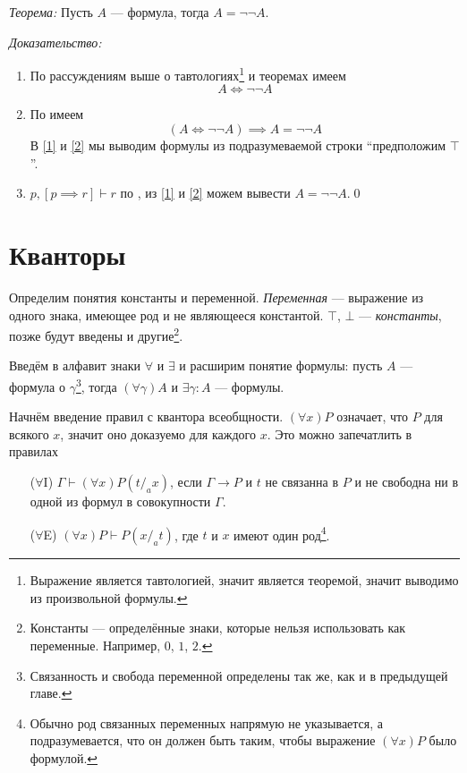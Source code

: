 {\it Теорема:} Пусть $A$ --- формула, тогда $A=\lnot\lnot A$.

	{\it Доказательство:}
\begin{enumerate}[label=(\arabic*)]
	\item{}\label{1}По рассуждениям выше о тавтологиях\footnote{
		Выражение является тавтологией, значит является теоремой,
		значит выводимо из произвольной формулы.} и теоремах
	имеем
	\[
		A\iff\lnot\lnot A
	\]

	\item{}\label{2}По \axiom{} имеем
	\[
		(A\iff \lnot\lnot A)\implies A=\lnot\lnot A
	\]
	В \ref{1} и \ref{2} мы выводим формулы из
	подразумеваемой строки ``предположим $\top$''.

	\item{}\label{3}${p,[p\implies r]\vdash r}$ по \taut{},
	из \ref{1} и \ref{2}
	можем вывести $A=\lnot\lnot A$.\qed
\end{enumerate}

\section{Кванторы}

\newcommand\Aii{$\forall$I}
\newcommand\Aee{$\forall$E}
\newcommand\Eii{$\exists$I}
\newcommand\Eee{$\exists$E}

Определим понятия константы и переменной. {\it Переменная} --- выражение из одного
знака, имеющее род и не являющееся константой. $\top$, $\bot$ --- {\it константы},
позже будут введены и другие\footnote{
	Константы --- определённые знаки, которые нельзя использовать как переменные.
	Например, $0$, $1$, $2$.
}.

Введём в алфавит знаки $\forall$ и $\exists$ и расширим понятие формулы:
пусть $A$ --- формула о $\gamma$\footnote{
	Связанность и свобода переменной определены так же, как и в предыдущей главе.
},
тогда $(\forall\gamma)A$ и $\exists\gamma:A$ --- формулы.

Начнём введение правил с квантора всеобщности. $(\forall x)P$ означает, что $P$ для
всякого $x$, значит оно доказуемо для каждого $x$. Это можно запечатлить
в правилах
\begin{enumerate}
	\item[(\Aii{})]{}$\Gamma\vdash(\forall x)P(t/_{a}x)$, если $\Gamma\to P$ и $t$
	не связанна в $P$ и
	не свободна ни в одной из формул в совокупности $\Gamma$.

	\item[(\Aee{})]{}$(\forall x)P\vdash P(x/_{a}t)$, где $t$ и $x$
	имеют один род\footnote{
		Обычно род связанных переменных напрямую не указывается, а подразумевается,
		что он должен быть таким, чтобы выражение $(\forall x)P$ было формулой.
	}.
\end{enumerate}

